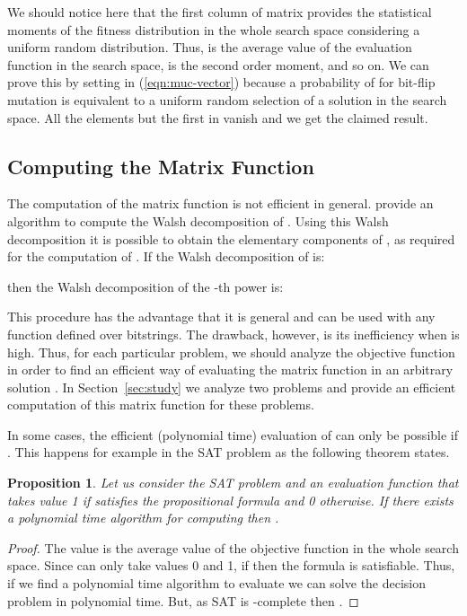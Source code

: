 \documentclass{article}
\newtheorem{proposition}{Proposition}
\begin{document}
We should notice here that the first column of matrix  provides the statistical moments of the fitness distribution in the whole search space considering a uniform random distribution. Thus,  is the average value of the evaluation function in the search space,  is the second order moment, and so on. We can prove this by setting  in (\ref{eqn:muc-vector}) because a probability of  for bit-flip mutation is equivalent to a uniform random selection of a solution in the search space. All the elements but the first in  vanish and we get the claimed result.

\subsection{Computing the Matrix Function }
\label{subsec:computing-f}

The computation of the matrix function  is not efficient in general. \cite{Sutton2011tcs} provide an algorithm to compute the Walsh decomposition of . Using this Walsh decomposition it is possible to obtain the elementary components of , as required for the computation of . If the Walsh decomposition of  is:

then the Walsh decomposition of the -th power  is:


This procedure has the advantage that it is general and can be used with any function defined over bitstrings. The drawback, however, is its inefficiency when  is high. Thus, for each particular problem, we should analyze the objective function in order to find an efficient way of evaluating the matrix function  in an arbitrary solution . In Section~\ref{sec:study} we analyze two problems and provide an efficient computation of this matrix function for these problems.

In some cases, the efficient (polynomial time) evaluation of  can only be possible if . This happens for example in the SAT problem as the following theorem states.

\begin{proposition}
Let us consider the SAT problem and an evaluation function  that takes value 1 if  satisfies the propositional formula and 0 otherwise. If there exists a polynomial time algorithm for computing  then .
\end{proposition}
\begin{proof}
The value  is the average value of the objective function in the whole search space. Since  can only take values 0 and 1, if  then the formula is satisfiable. Thus, if we find a polynomial time algorithm to evaluate  we can solve the decision problem in polynomial time. But, as SAT is -complete then .
\end{proof}
\end{document}
